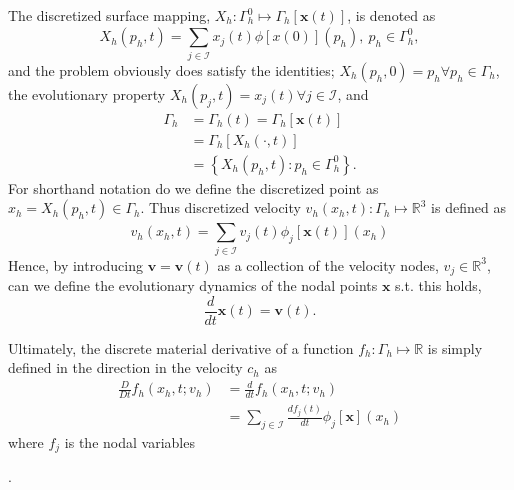 The discretized surface mapping, $X_{h}: \Gamma_{h} ^{0} \mapsto  \Gamma _{h} \left[ \mathbf{x}\left( t \right)  \right] $, is denoted as \[
X_{h}\left( p_{h},t \right) = \sum_{j \in \mathcal{I} }^{}  x_{j}\left( t \right)  \phi \left[ x\left( 0 \right)  \right] \left( p_{h} \right), \  p_{h} \in \Gamma ^{0}_{h},
\]
and the problem obviously does satisfy the identities; $X_{h}\left( p_{h},0 \right)  = p_{h} \forall p_{h} \in \Gamma _{h}$, the evolutionary property $X_{h} \left( p_{j}, t \right)  = x_{j}\left( t \right)  \forall j \in \mathcal{I} $, and
\[
    \begin{split}
        \Gamma _{h} & = \Gamma_{h} \left( t \right) =   \Gamma_{h} \left[ \mathbf{x}\left( t \right)  \right]  \\
                                    &= \Gamma_{h}\left[ X_{h}\left( \cdot ,t \right)  \right] \\
&=\left\{ X_{h}\left( p_{h},t \right): p_{h} \in  \Gamma ^{0}_{h} \right\}.
    \end{split}
\]
For shorthand notation do we define the discretized point as $x_{h} = X_{h}\left( p_{h},t \right) \in \Gamma _{h} $.
Thus discretized velocity $v_{h}\left( x_{h},t \right): \Gamma _{h} \mapsto  \mathbb{R} ^{3} $ is defined as \[
    v_{h}\left( x_{h},t \right)  = \sum_{j \in \mathcal{I} }^{} v_{j}\left( t \right) \phi _{j}\left[ \mathbf{x}\left( t \right)  \right] \left( x_{h} \right)
\]
Hence, by introducing  $\mathbf{v} = \mathbf{v}\left( t \right)  $ as a collection of the velocity nodes,  $v_{j} \in \mathbb{R} ^3$, can we define the evolutionary dynamics of the nodal points $\mathbf{x}$ s.t. this holds,
\[
\frac{d}{dt}\mathbf{x}\left( t \right) = \mathbf{v}\left( t \right).
\]

Ultimately, the discrete material derivative of a function $f_{h}: \Gamma _{h} \mapsto  \mathbb{R} $ is simply defined in the direction in the velocity $c_{h}$  as \[
    \begin{split}
\frac{D}{Dt}f_{h}\left( x_{h}, t; v_{h}   \right) & = \frac{d}{dt} f_{h}\left( x_{h}, t; v_{h}   \right) \\
 & = \sum_{j \in \mathcal{I} }^{} \frac{d f_{j} \left( t \right) }{dt} \phi _{j}\left[ \mathbf{x} \right] \left( x_{h} \right)
    \end{split}
\]
where $f_{j}$ is the nodal variables

.















